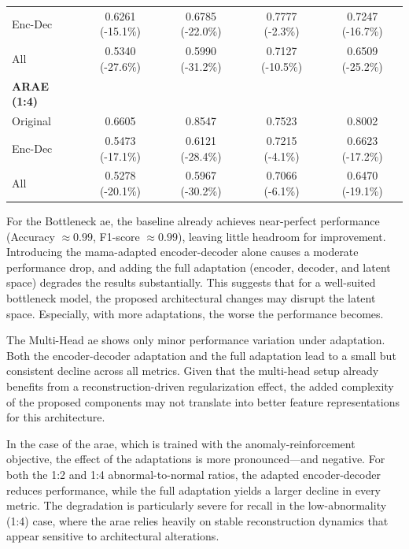 \begin{table}[h!]
{\begin{tabular}{lcccc}
    \quad Enc-Dec & 
    0.6261 (-15.1\%) & 
    0.6785 (-22.0\%) & 
    0.7777 (-2.3\%) & 
    0.7247 (-16.7\%) \\
    
    \quad All & 
    0.5340 (-27.6\%) & 
    0.5990 (-31.2\%) & 
    0.7127 (-10.5\%) & 
    0.6509 (-25.2\%) \\

    \hline\hline

    \textbf{ARAE (1:4)} \\
    \quad Original & 
    0.6605 & 
    0.8547 & 
    0.7523 & 
    0.8002 \\
    
    \quad Enc-Dec & 
    0.5473 (-17.1\%) & 
    0.6121 (-28.4\%) & 
    0.7215 (-4.1\%) & 
    0.6623 (-17.2\%) \\
    
    \quad All & 
    0.5278 (-20.1\%) & 
    0.5967 (-30.2\%) & 
    0.7066 (-6.1\%) & 
    0.6470 (-19.1\%) \\

    \bottomrule
\end{tabular}}
\end{table}

For the Bottleneck \gls{ae}, the baseline already achieves near-perfect performance (Accuracy $\approx 0.99$, F1-score $\approx 0.99$), leaving little headroom for improvement. 
Introducing the \gls{mama}-adapted encoder-decoder alone causes a moderate performance drop, and adding the full adaptation (encoder, decoder, and latent space) degrades the results substantially. 
This suggests that for a well-suited bottleneck model, the proposed architectural changes may disrupt the latent space.
Especially, with more adaptations, the worse the performance becomes.

The Multi-Head \gls{ae} shows only minor performance variation under adaptation.
Both the encoder-decoder adaptation and the full adaptation lead to a small but consistent decline across all metrics.
Given that the multi-head setup already benefits from a reconstruction-driven regularization effect, the added complexity of the proposed components may not translate into better feature representations for this architecture.

In the case of the \gls{arae}, which is trained with the anomaly-reinforcement objective, the effect of the adaptations is more pronounced—and negative.
For both the 1:2 and 1:4 abnormal-to-normal ratios, the adapted encoder-decoder reduces performance, while the full adaptation yields a larger decline in every metric.
The degradation is particularly severe for recall in the low-abnormality (1:4) case, where the \gls{arae} relies heavily on stable reconstruction dynamics that appear sensitive to architectural alterations.


